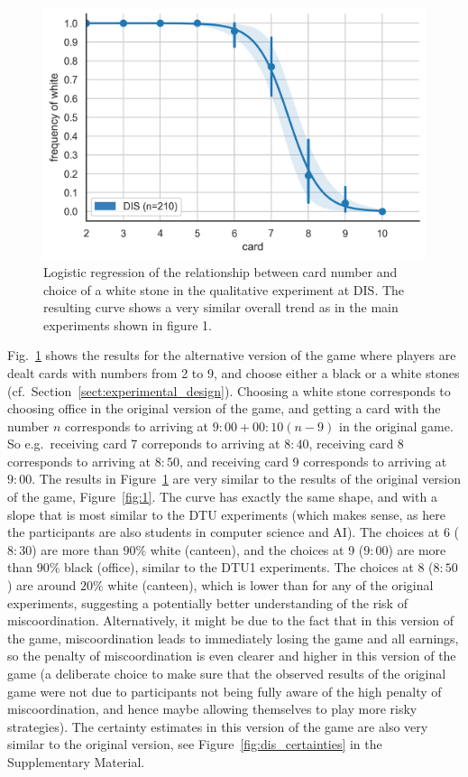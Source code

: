 \documentclass[twocolumn,a4paper,superscriptaddress,nofootinbib]{revtex4}
\begin{document}
\begin{figure} %
  \centering\includegraphics[width=0.6\linewidth]{fig5_DIS.png}
  \caption{Logistic regression of the relationship between card number and choice of a white stone in the qualitative experiment at DIS. The resulting curve shows a very similar overall trend as in the main experiments shown in figure 1.}
  \label{fig:dis}
  \end{figure}  
Fig.~\ref{fig:dis} shows the results for the alternative version of the game where players are dealt cards with numbers from 2 to 9, and choose either a black or a white stones (cf.\ Section~\ref{sect:experimental_design}). Choosing a white stone corresponds to choosing office in the original version of the game, and getting a card with the number $n$ corresponds to arriving at $9{:}00+00{:}10(n-9)$ in the original game. So e.g.\ receiving card 7 correponds to arriving at $8{:}40$, receiving card 8 corresponds to arriving at $8{:}50$, and receiving card 9 corresponds to arriving at $9{:}00$. The results in Figure~\ref{fig:dis} are very similar to the results of the original version of the game, Figure~\ref{fig:1}. The curve has exactly the same shape, and with a slope that is most similar to the DTU experiments (which makes sense, as here the participants are also students in computer science and AI). The choices at 6 ($8{:}30$) are more than $90\%$ white (canteen), and the choices at 9 ($9{:}00$) are more than $90\%$ black (office), similar to the DTU1 experiments. The choices at 8 ($8{:}50$) are around $20\%$ white (canteen), which is lower than for any of the original experiments, suggesting a potentially better understanding of the risk of miscoordination. Alternatively, it might be due to the fact that in this version of the game, miscoordination leads to immediately losing the game and all earnings, so the penalty of miscoordination is even clearer and higher in this version of the game (a deliberate choice to make sure that the observed results of the original game were not due to participants not being fully aware of the high penalty of miscoordination, and hence maybe allowing themselves to play more risky strategies). The certainty estimates in this version of the game are also very similar to the original version, see Figure~\ref{fig:dis_certainties} in the Supplementary Material.
\end{document}

